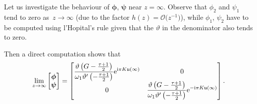 \documentclass[10pt,a4paper]{amsart}
\numberwithin{equation}{section}
\theoremstyle{definition}
\def\Abel{\mathfrak u}
\def\le{\left}
\def \bs{\boldsymbol}
\def\ri{\right}
\begin{document}
Let us investigate the behaviour of $\bs \phi$, $\bs \psi$ near $z=\infty$.
Observe that $\phi_2$ and $\psi_1$ tend to zero as~${z\to\infty}$ \big(due to the factor $h(z) = \mathcal O\bigl(z^{-1}\bigr)$\big), while $\phi_1$, $\psi_2$ have to be computed using l'Hopital's rule given that the $\vartheta$ in the denominator also tends to zero.

Then a direct computation shows that
\[
\lim_{z\to\infty} \begin{bmatrix}
\bs\phi\\
\bs \psi\end{bmatrix} =
\begin{bmatrix} \displaystyle \frac {\vartheta\le(G- \frac {\tau + 1}2\ri)}{\omega_1 \vartheta'\le(-\frac {\tau + 1}2\ri)}{\rm e}^{{\rm i}\pi K\Abel(\infty)} & 0
\\0 & \displaystyle \frac {\vartheta\le(G- \frac {\tau + 1}2\ri)}{\omega_1 \vartheta'\le(-\frac {\tau + 1}2\ri)}{\rm e}^{-{\rm i}\pi K\Abel(\infty)}
\end{bmatrix}.
\]
\end{document}
